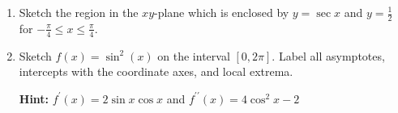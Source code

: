 \documentclass[12pt]{article}
\newif\ifans
\begin{document}
\begin{enumerate}
\ifans\fbox{\texttt{[image: lips.pdf]}} \fi

\item Sketch the region in the $xy$-plane which is enclosed by $y=\sec{x}$ and $y=\frac{1}{2}$ for $-\frac{\pi}{4}\leq x \leq \frac{\pi}{4}$.

\ifans\fbox{\texttt{[image: sec\_area.pdf]}} \fi

\item Sketch $f(x) = \sin^2(x)$ on the interval $[0,2\pi]$.  Label all asymptotes, intercepts with the coordinate axes, and local extrema.

{\bf Hint:} $f^{\prime}(x) = 2\sin{x}\cos{x}$ and $f^{\prime\prime}(x)=4\cos^2{x}-2$

\ifans{\fbox{ \texttt{[image: SineSquared.png]}}} \fi

\end{enumerate}
\end{document}
